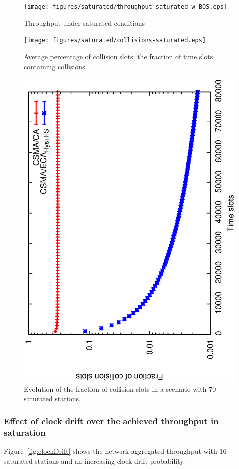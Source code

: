\documentclass[a4paper,journal]{IEEEtran}
\begin{document}
	\begin{figure}[tb]
	\centering
		\texttt{[image: figures/saturated/throughput-saturated-w-BOS.eps]}
		\caption{Throughput under saturated conditions}
		\label{fig:throughput-sat}
	\end{figure}
	
	\begin{figure}[tb]
	\centering
		\texttt{[image: figures/saturated/collisions-saturated.eps]}
		\caption{Average percentage of collision slots: the fraction of time slots containing collisions.}
		\label{fig:collisions-sat}
	\end{figure}
	
	\begin{figure}[tb]
	\centering
		\includegraphics[width=0.7\linewidth,angle=-90]{figures/saturated/slots/Pc-evolution.eps}
		\caption{Evolution of the fraction of collision slots in a scenario with 70 saturated stations.}
		\label{fig:collisions-evolution}
	\end{figure}
	
	\subsubsection{Effect of clock drift over the achieved throughput in saturation}\label{performanceClockDrift}
	Figure~\ref{fig:clockDrift} shows the network aggregated throughput with 16 saturated stations and an increasing clock drift probability.
	
\end{document}
